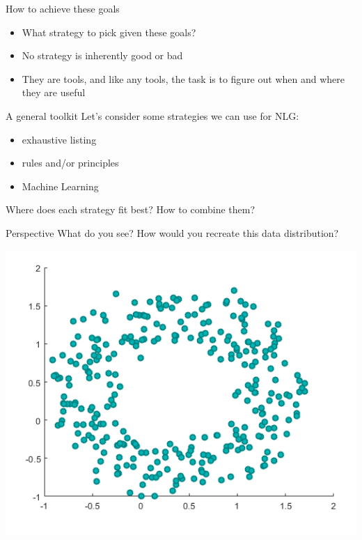 \documentclass[10pt, compress]{beamer}
\begin{document}
\begin{frame}{How to achieve these goals}
	\begin{itemize}
		\item What strategy to pick given these goals?	\pause
		\item No strategy is inherently good or bad \pause
		\item They are tools, and like any tools, the task is to figure out when and where they are useful
	\end{itemize}
\end{frame}

\begin{frame}{A general toolkit}
	Let's consider some strategies we can use for NLG: \pause

	\begin{itemize}
		\item exhaustive listing \pause
		\item rules and/or principles \pause
		\item Machine Learning \pause
	\end{itemize}

	\pause

	Where does each strategy fit best? How to combine them?
\end{frame}

\begin{frame}{Perspective}
	What do you see? How would you recreate this data distribution?

	\includegraphics[width=.85\textwidth]{images/circleplot.png}
\end{frame}
\end{document}
